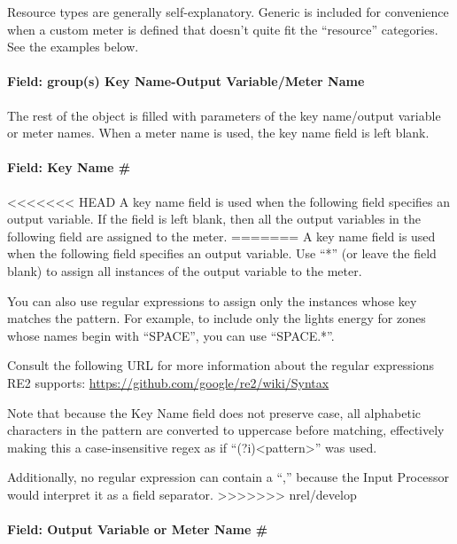 Resource types are generally self-explanatory. Generic is included for convenience when a custom meter is defined that doesn't quite fit the ``resource'' categories. See the examples below.

\paragraph{Field: group(s) Key Name-Output Variable/Meter Name}\label{field-groups-key-name-output-variablemeter-name}

The rest of the object is filled with parameters of the key name/output variable or meter names. When a meter name is used, the key name field is left blank.

\paragraph{Field: Key Name \#}\label{field-key-name}

<<<<<<< HEAD
A key name field is used when the following field specifies an output variable. If the field is left blank, then all the output variables in the following field are assigned to the meter.
=======
A key name field is used when the following field specifies an output variable.
Use ``*'' (or leave the field blank) to assign all instances of the output variable to the meter.

You can also use regular expressions to assign only the instances whose key matches the pattern.
For example, to include only the lights energy for zones whose names begin with ``SPACE'', you can use ``SPACE.*''.

Consult the following URL for more information about the regular expressions RE2 supports: \url{https://github.com/google/re2/wiki/Syntax}

Note that because the Key Name field does not preserve case, all alphabetic characters in the pattern are converted to uppercase before matching, effectively making this a case-insensitive regex as if ``(?i)<pattern>'' was used.

Additionally, no regular expression can contain a ``,'' because the Input Processor would interpret it as a field separator.
>>>>>>> nrel/develop

\paragraph{Field: Output Variable or Meter Name \#}\label{field-output-variable-or-meter-name}

